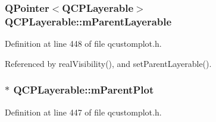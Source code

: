 \subsubsection[{m\+Parent\+Layerable}]{\setlength{\rightskip}{0pt plus 5cm}Q\+Pointer$<${\bf Q\+C\+P\+Layerable}$>$ Q\+C\+P\+Layerable\+::m\+Parent\+Layerable\hspace{0.3cm}{\ttfamily [protected]}}\label{class_q_c_p_layerable_a3291445a980053e2d17a21d15957624e}


Definition at line 448 of file qcustomplot.\+h.



Referenced by real\+Visibility(), and set\+Parent\+Layerable().

\hypertarget{class_q_c_p_layerable_aa2a528433e44db02b8aef23c1f9f90ed}{}
\subsubsection[{m\+Parent\+Plot}]{$\ast$ Q\+C\+P\+Layerable\+::m\+Parent\+Plot\hspace{0.3cm}{\ttfamily [protected]}}\label{class_q_c_p_layerable_aa2a528433e44db02b8aef23c1f9f90ed}


Definition at line 447 of file qcustomplot.\+h.



